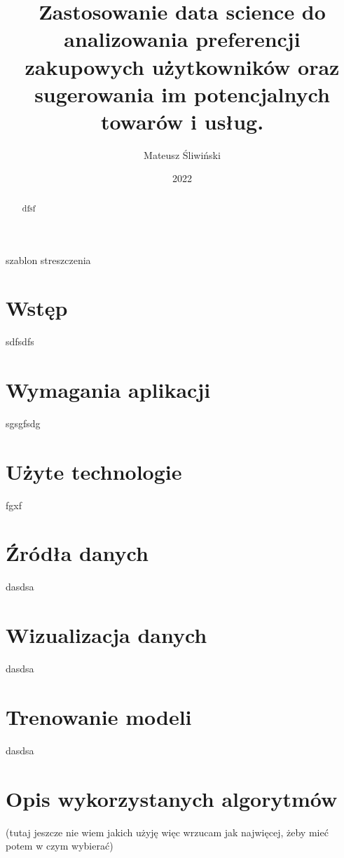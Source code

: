 \documentclass[wmii, inf, mgr]{uwmthesis}
\date{2022}
\title{Zastosowanie data science do analizowania preferencji zakupowych użytkowników oraz sugerowania im potencjalnych towarów i usług.}
\author{Mateusz Śliwiński}
\begin{document}
\maketitle





\begin{streszczenie}
szablon streszczenia

\end{streszczenie}

\begin{abstract}
dfsf 

\end{abstract}


\tableofcontents

\chapter*{Wstęp}

sdfsdfs

\chapter{Wymagania aplikacji}

sgsgfsdg

\chapter{Użyte technologie}

fgxf

\chapter{Źródła danych }
dasdsa

\chapter{Wizualizacja danych }
dasdsa

\chapter{Trenowanie modeli }
dasdsa


\chapter{Opis wykorzystanych algorytmów }
(tutaj jeszcze nie wiem jakich użyję więc wrzucam jak najwięcej, żeby mieć potem w czym wybierać)
\end{document}
